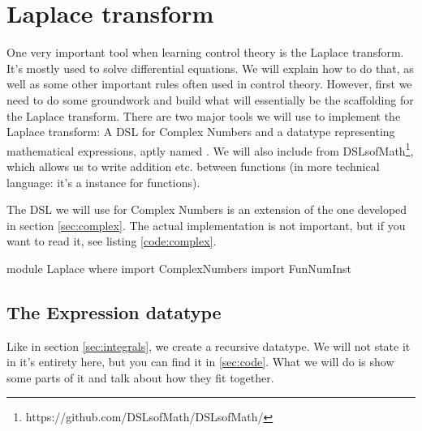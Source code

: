 \section{Laplace transform}
One very important tool when learning control theory is the Laplace transform.
It's mostly used to solve differential equations. We will explain how to do that, as well as some other important rules often used in control theory.
However, first we need to do some groundwork and build what will essentially be the scaffolding for the Laplace transform.
There are two major tools we will use to implement the Laplace transform: A DSL for Complex Numbers and a datatype representing mathematical expressions, aptly named . 
We will also include  from DSLsofMath\footnote{https://github.com/DSLsofMath/DSLsofMath/}, which allows us to write addition etc. between functions (in more technical language: it's a  instance for functions).

The DSL we will use for Complex Numbers is an extension of the one developed in section \ref{sec:complex}. The actual implementation is not important, but if you want to read it, see listing \ref{code:complex}.

\begin{code}
module Laplace where
import ComplexNumbers
import FunNumInst 
\end{code}



\subsection{The Expression datatype}
Like in section \ref{sec:integrals}, we create a recursive datatype. We will not
state it in it's entirety here, but you can find it in \ref{sec:code}. What we
will do is show some parts of it and talk about how they fit together. 

